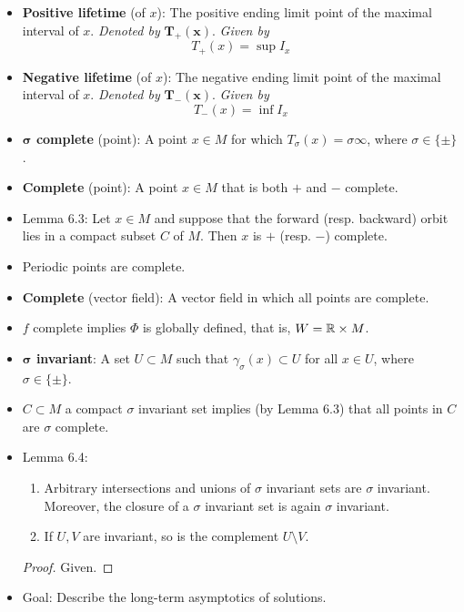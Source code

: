 \documentclass[../notes.tex]{subfiles}
\begin{document}
\begin{itemize}
    \item \textbf{Positive lifetime} (of $x$): The positive ending limit point of the maximal interval of $x$. \emph{Denoted by} $\bm{T_+(x)}$. \emph{Given by}
    \begin{equation*}
        T_+(x) = \sup I_x
    \end{equation*}
    \item \textbf{Negative lifetime} (of $x$): The negative ending limit point of the maximal interval of $x$. \emph{Denoted by} $\bm{T_-(x)}$. \emph{Given by}
    \begin{equation*}
        T_-(x) = \inf I_x
    \end{equation*}
    \item \textbf{$\bm{\sigma}$ complete} (point): A point $x\in M$ for which $T_\sigma(x)=\sigma\infty$, where $\sigma\in\{\pm\}$.
    \item \textbf{Complete} (point): A point $x\in M$ that is both $+$ and $-$ complete.
    \item Lemma 6.3: Let $x\in M$ and suppose that the forward (resp. backward) orbit lies in a compact subset $C$ of $M$. Then $x$ is $+$ (resp. $-$) complete.
    \item Periodic points are complete.
    \item \textbf{Complete} (vector field): A vector field in which all points are complete.
    \item $f$ complete implies $\Phi$ is globally defined, that is, $W=\mathbb{R}\times M$.
    \item \textbf{$\bm{\sigma}$ invariant}: A set $U\subset M$ such that $\gamma_\sigma(x)\subset U$ for all $x\in U$, where $\sigma\in\{\pm\}$.
    \item $C\subset M$ a compact $\sigma$ invariant set implies (by Lemma 6.3) that all points in $C$ are $\sigma$ complete.
    \item Lemma 6.4:
    \begin{enumerate}
        \item Arbitrary intersections and unions of $\sigma$ invariant sets are $\sigma$ invariant. Moreover, the closure of a $\sigma$ invariant set is again $\sigma$ invariant.
        \item If $U,V$ are invariant, so is the complement $U\setminus V$.
    \end{enumerate}
    \begin{proof}
        Given.
    \end{proof}
    \item Goal: Describe the long-term asymptotics of solutions.

\end{itemize}
\end{document}

